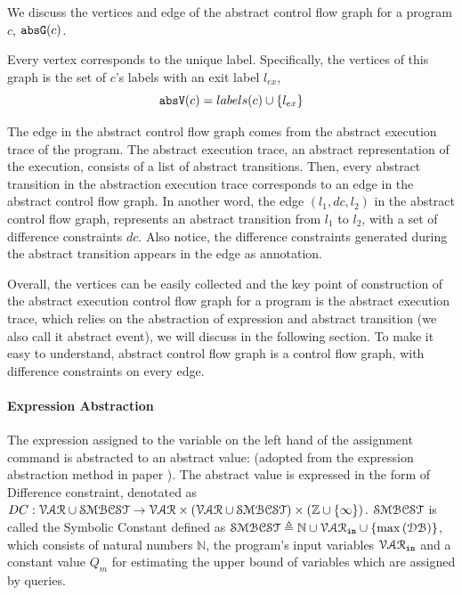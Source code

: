 We discuss the vertices and edge of the
abstract control flow graph for a program $c$, $\mathtt{abs}{\mathtt{G}}(c)$.

Every 
vertex corresponds to the unique
label.
Specifically,
the vertices of this graph is the set of $c$'s labels with an exit label $l_{ex}$, 
\[ 
  \mathtt{abs}{\mathtt{V}}(c) = labels(c)\cup\{l_{ex}\}
  \]

  The edge in the abstract control flow graph comes from the abstract execution trace of the program. 
  The abstract execution trace, an abstract representation of the execution, consists of a list of abstract transitions. 
  Then, every abstract transition in the abstraction execution trace corresponds to an edge in the abstract control flow graph. In another word, the edge $(l_1, dc, l_2)$ in the abstract control flow graph, represents an abstract transition 
 from $l_1$ to $l_2$, with a set of difference constraints $dc$. 
 Also notice, the difference constraints generated during the abstract transition appears in the edge as annotation.



  Overall, the vertices can be easily collected and the key point of construction of the abstract execution control flow graph for a program is the abstract execution trace, 
  which relies on the abstraction of expression and abstract transition (we also call it abstract event), we will discuss in the following section.
   To make it easy to understand, abstract control flow graph is a control flow graph, with difference constraints on every edge.

%
\paragraph*{Expression Abstraction}

The expression assigned to the variable on the left hand of the assignment command is abstracted to an abstract value: (adopted from the expression abstraction method in paper \cite{sinn2017complexity}). The abstract value is expressed in the form of Difference constraint, denotated as $DC : \mathcal{VAR} \cup \mathcal{SMBCST} \to \mathcal{\mathcal{VAR} \times (\mathcal{VAR} \cup \mathcal{SMBCST}) } \times (\mathbb{Z} \cup \{\infty\})$.  $\mathcal{SMBCST}$ is called the Symbolic Constant defined as $\mathcal{SMBCST} \triangleq \mathbb{N} \cup \mathcal{VAR}_{\mathtt{in}} \cup \{\max{(\mathcal{DB})}\} $, which consists of 
natural numbers $\mathbb{N}$,
the program's input variables $\mathcal{VAR}_{\mathtt{in}}$  
and a constant value $Q_m$ for estimating the upper bound of variables which are
assigned by queries. 

